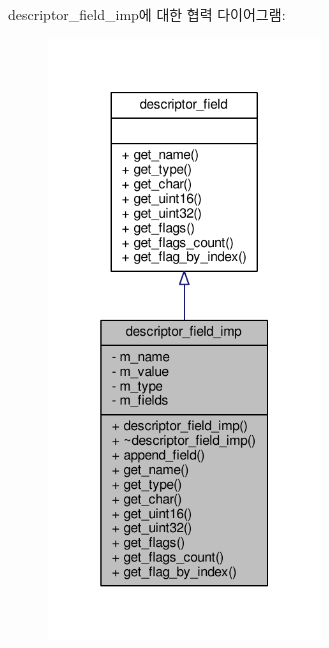 descriptor\+\_\+field\+\_\+imp에 대한 협력 다이어그램\+:
\nopagebreak
\begin{figure}[H]
\begin{center}
\leavevmode
\includegraphics[width=205pt]{classavdecc__lib_1_1descriptor__field__imp__coll__graph}
\end{center}
\end{figure}
